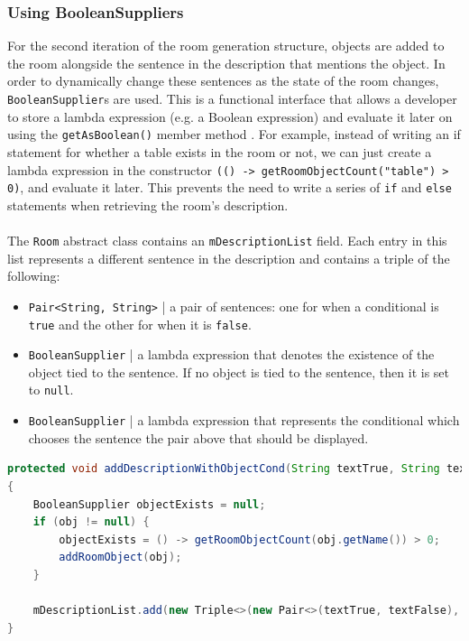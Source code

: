 \documentclass[11pt]{article}
\begin{document}
\subsubsection{Using BooleanSuppliers}

For the second iteration of the room generation structure, objects are added to the room alongside the sentence in the description that mentions the object. In order to dynamically change these sentences as the state of the room changes, \texttt{BooleanSupplier}s are used. This is a functional interface that allows a developer to store a lambda expression (e.g. a Boolean expression) and evaluate it later on using the \texttt{getAsBoolean()} member method \cite{RefWorks:125}. For example, instead of writing an if statement for whether a table exists in the room or not, we can just create a lambda expression in the constructor \texttt{(() -> getRoomObjectCount("table") > 0)}, and evaluate it later. This prevents the need to write a series of \texttt{if} and \texttt{else} statements when retrieving the room's description.
\\
\\
The \texttt{Room} abstract class contains an \texttt{mDescriptionList} field. Each entry in this list represents a different sentence in the description and contains a triple of the following:

\begin{itemize}
\item \texttt{Pair<String, String>} | a pair of sentences: one for when a conditional is \texttt{true} and the other for when it is \texttt{false}.

\item \texttt{BooleanSupplier} | a lambda expression that denotes the existence of the object tied to the sentence. If no object is tied to the sentence, then it is set to \texttt{null}.

\item \texttt{BooleanSupplier} | a lambda expression that represents the conditional which chooses the sentence the pair above that should be displayed.
\end{itemize}

\begin{lstlisting}[language=Java, caption=Room::addDescriptionWithObjectCond(), label=lst:room-description-code]
protected void addDescriptionWithObjectCond(String textTrue, String textFalse, Entity obj, BooleanSupplier cond)
{
    BooleanSupplier objectExists = null;
    if (obj != null) {
        objectExists = () -> getRoomObjectCount(obj.getName()) > 0;
        addRoomObject(obj);
    }

    mDescriptionList.add(new Triple<>(new Pair<>(textTrue, textFalse), objectExists, cond));
}
\end{lstlisting}
\end{document}

